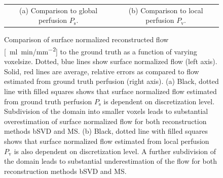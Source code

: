 \documentclass[final,5p,times,twocolumn]{elsarticle}
\begin{document}
\begin{figure}[!htb]
\begin{tabular}{c c}
    		(a) Comparison to global perfusion $P_{\mathrm{s}}$. & (b) Comparison to local perfusion $P_{\mathrm{v}}$.
    	\end{tabular}
    	\caption{Comparison of surface normalized reconstructed flow [\SI{}{\milli\litre\per\minute/\milli\meter\squared}] to the ground truth as a function of varying voxelsize. Dotted, blue lines show surface normalized flow (left axis). Solid, red lines are average, relative errors as compared to flow estimated from ground truth perfusion (right axis). (a) Black, dotted line with filled squares shows that surface normalized flow estimated from ground truth perfusion $P_{\mathrm{s}}$ is dependent on discretization level. Subdivision of the domain into smaller voxels leads to substantial overestimation of surface normalized flow for both reconstruction methods bSVD and MS. (b) Black, dotted line with filled squares shows that surface normalized flow estimated from local perfusion $P_{\mathrm{v}}$ is also dependent on discretization level. A further subdivision of the domain leads to substantial underestimation of the flow for both reconstruction methods bSVD and MS.}
            \label{fig:surfnormperf}
    \end{figure}
\end{document}
